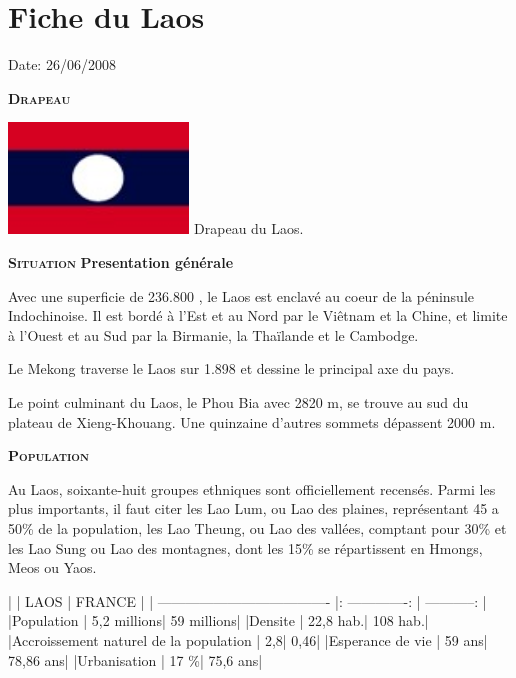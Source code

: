 \section{Fiche du Laos}

Date: 26/06/2008

\begin{multicols}{2}

\textbf{\textsc{Drapeau}}

\hspace*{-0.65cm}
\includegraphics[width=4.8cm]{articles/Fiche-du-laos/1214470058Q382.jpg}
Drapeau du Laos.


\textbf{\textsc{Situation}}
\textbf{Presentation générale}

Avec une superficie de 236.800 \kilo\meter\squared, le Laos est enclavé au coeur de la péninsule Indochinoise. Il est bordé à l’Est et au Nord par le Viêtnam et la Chine, et limite à l’Ouest et au Sud par la Birmanie, la Thaïlande et le Cambodge.

Le Mekong traverse le Laos sur 1.898 \kilo\meter et dessine le principal axe du pays.

Le point culminant du Laos, le Phou Bia avec 2820 m, se trouve au sud du plateau de Xieng-Khouang. Une quinzaine d’autres sommets dépassent 2000 m.

\textbf{\textsc{Population}}

Au Laos, soixante-huit groupes ethniques sont officiellement recensés. Parmi les plus importants, il faut citer les Lao Lum, ou Lao des plaines, représentant 45 a 50\% de la population, les Lao Theung, ou Lao des vallées, comptant pour 30\% et les Lao Sung ou Lao des montagnes, dont les 15\% se répartissent en Hmongs, Meos ou Yaos.

|                                       |       LAOS      |    FRANCE    |
| ------------------------------------- |: -------------: | -----------: |
|Population                             |     5,2 millions|  	59 millions|
|Densite                                |     22,8 hab.\kilo\meter\squared|   108 hab.\kilo\meter\squared|
|Accroissement naturel de la population |              2,8|          0,46|
|Esperance de vie                       |           59 ans|     78,86 ans|
|Urbanisation                           |            17 \%|      75,6 ans|


\end{multicols}
